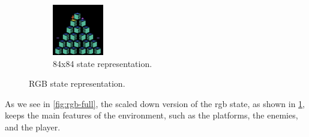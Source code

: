 \begin{figure}[H]
\begin{subfigure}{0.45\textwidth}
        \includegraphics[width=\textwidth]{img/rgb-84x84-purple.png}
        \caption{84x84 state representation.}
        \label{fig:rgb-84x84}
    \end{subfigure}
    \caption{RGB state representation.}
    \label{fig:rgb-state}
\end{figure}

As we see in \cref{fig:rgb-full}, the scaled down version of the \gls{rgb}
state, as shown in \cref{fig:rgb-84x84}, keeps the main features of the
environment, such as the platforms, the enemies, and the player.